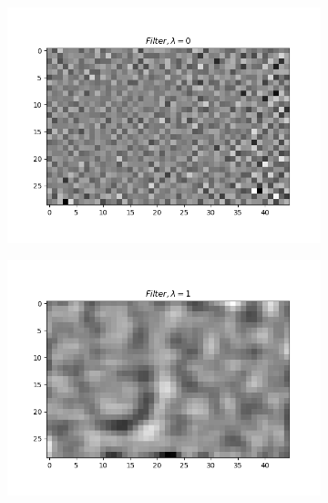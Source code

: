 \documentclass{article} %
\begin{document}
    \begin{figure}[H]
        \centering
        \begin{subfigure}[b]{0.49\textwidth}
            \centering
            \includegraphics[width=\textwidth]{q43_filt0.png}
        \end{subfigure}
        \begin{subfigure}[b]{0.49\textwidth}
            \centering
            \includegraphics[width=\textwidth]{q43_filt1.png}
        \end{subfigure}
        \begin{subfigure}[b]{0.49\textwidth}
            \centering

\end{subfigure}
\end{figure}
\end{document}
